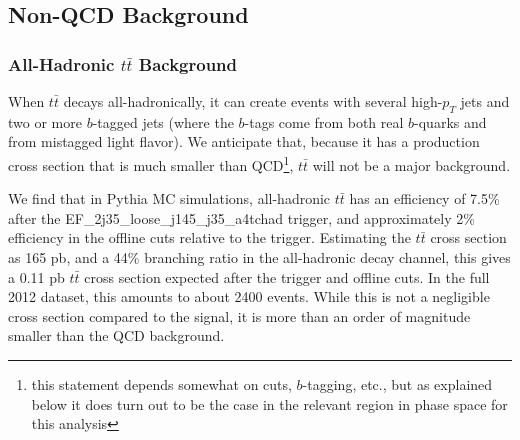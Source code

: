 


\subsection{Non-QCD Background}
\label{sec:non_qcd_bkgs}

\subsubsection{All-Hadronic $t\bar{t}$ Background}
When $t\bar{t}$ decays all-hadronically, it can create events with several high-$p_T$
jets and two or more $b$-tagged jets (where the $b$-tags come from both real $b$-quarks
and from mistagged light flavor).  We anticipate that, because it has a production
cross section that is much smaller than QCD\footnote{this statement depends somewhat
on cuts, $b$-tagging, etc., but as explained below it does turn out to be the case
in the relevant region in phase space for this analysis}, $t\bar{t}$ will not be a major background.




We find that in Pythia MC simulations, all-hadronic $t\bar{t}$ has an efficiency of 7.5\% after
the EF\_2j35\_loose\_j145\_j35\_a4tchad trigger, and approximately 2\% efficiency
in the offline cuts relative to the trigger.  Estimating the $t\bar{t}$ cross section
as 165 pb, and a 44\% branching ratio in the all-hadronic decay channel, this gives
a 0.11 pb $t\bar{t}$ cross section expected after the trigger and offline cuts.  In the
full 2012 dataset, this amounts to about 2400 events.  While
this is not a negligible cross section compared to the signal, it is more than an
order of magnitude smaller than the QCD background.

